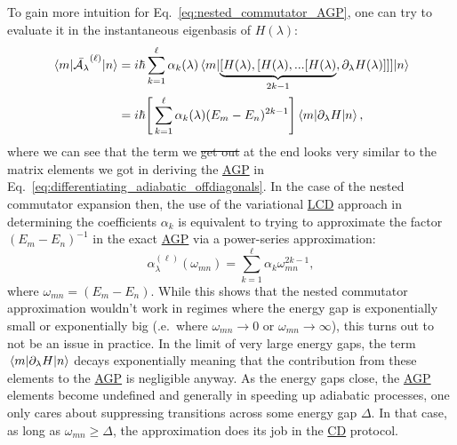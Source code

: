\documentclass[a4paper,oneside,11pt]{book}
\newcommand{\dlambda}{\partial_{\lambda}}
\newcommand{\AGP}[1]{\mathcal{A}_{#1}}
\newcommand{\acrref}[1]{\hyperref[acr:#1]{#1}}
\providecommand{\DIFaddtex}[1]{{\protect\color{blue}\uwave{#1}}} %
\providecommand{\DIFdeltex}[1]{{\protect\color{red}\sout{#1}}}                      %
\providecommand{\DIFaddbegin}{} %
\providecommand{\DIFaddend}{} %
\providecommand{\DIFdelbegin}{} %
\providecommand{\DIFdelend}{} %
\providecommand{\DIFadd}[1]{\texorpdfstring{\DIFaddtex{#1}}{#1}} %
\providecommand{\DIFdel}[1]{\texorpdfstring{\DIFdeltex{#1}}{}} %
\newcommand{\DIFscaledelfig}{0.5}
\newlength{\DIFdelgraphicswidth} %
\newlength{\DIFdelgraphicsheight} %
\newcommand{\DIFaddincludegraphics}[2][]{{\color{blue}\fbox{\DIFOincludegraphics[#1]{#2}}}} %
\newcommand{\DIFdelincludegraphics}[2][]{%
\sbox{\DIFdelgraphicsbox}{\DIFOincludegraphics[#1]{#2}}%
\settoboxwidth{\DIFdelgraphicswidth}{\DIFdelgraphicsbox} %
\settoboxtotalheight{\DIFdelgraphicsheight}{\DIFdelgraphicsbox} %
\scalebox{\DIFscaledelfig}{%
\parbox[b]{\DIFdelgraphicswidth}{\usebox{\DIFdelgraphicsbox}\\[-\baselineskip] \rule{\DIFdelgraphicswidth}{0em}}\llap{\resizebox{\DIFdelgraphicswidth}{\DIFdelgraphicsheight}{%
\setlength{\unitlength}{\DIFdelgraphicswidth}%
\begin{picture}(1,1)%
\thicklines\linethickness{2pt} %
{\color[rgb]{1,0,0}\put(0,0){\framebox(1,1){}}}%
{\color[rgb]{1,0,0}\put(0,0){\line( 1,1){1}}}%
{\color[rgb]{1,0,0}\put(0,1){\line(1,-1){1}}}%
\end{picture}%
}\hspace*{3pt}}} %
} %
\DeclareRobustCommand{\DIFaddbegin}{\DIFOaddbegin \let\includegraphics\DIFaddincludegraphics} %
\DeclareRobustCommand{\DIFaddend}{\DIFOaddend \let\includegraphics\DIFOincludegraphics} %
\DeclareRobustCommand{\DIFdelbegin}{\DIFOdelbegin \let\includegraphics\DIFdelincludegraphics} %
\DeclareRobustCommand{\DIFdelend}{\DIFOaddend \let\includegraphics\DIFOincludegraphics} %
\begin{document}
    To gain more intuition for Eq.~\eqref{eq:nested_commutator_AGP}, one can try to evaluate it in the instantaneous eigenbasis of $H(\lambda)$:
    \begin{equation}\label{eq:nested_commutator_matrix_elements}
        \begin{aligned}
            \mel*{m}{\Bar{\AGP{\lambda}}^{(\ell)}}{n} &= i\hbar \sum_{k=1}^\ell \alpha_k(\lambda) \mel*{m}{\underbrace{[H(\lambda),[H(\lambda),...[H(\lambda)}_{2k-1},\dlambda H(\lambda)]]]}{n} \\
            &= i\hbar \Bigg[ \sum_{k=1}^\ell \alpha_k(\lambda)(E_m - E_n)^{2k - 1} \Bigg] \mel{m}{\dlambda H}{n},
        \end{aligned}
    \end{equation}
    where we can see that the term we \DIFdelbegin \DIFdel{get out }\DIFdelend \DIFaddbegin \DIFadd{obtain }\DIFaddend at the end looks very similar to the matrix elements we got in deriving the \acrref{AGP} in Eq.~\eqref{eq:differentiating_adiabatic_offdiagonals}. In the case of the nested commutator expansion then, the use of the variational \acrref{LCD} approach in determining the coefficients $\alpha_k$ is equivalent to trying to approximate the factor $(E_m - E_n)^{- 1}$ in the exact \acrref{AGP} via a power-series approximation:
    \begin{equation}
        \alpha_{\lambda}^{(\ell)}(\omega_{mn}) = \sum_{k=1}^\ell \alpha_k \omega_{mn}^{2k - 1},
    \end{equation}
    where $\omega_{mn} = (E_m - E_n)$. While this shows that the nested commutator approximation wouldn't work in regimes where the energy gap is exponentially small or exponentially big (\@i.e.~where $\omega_{mn} \rightarrow 0$ or $\omega_{mn} \rightarrow \infty$), this turns out to not be an issue in practice. In the limit of very large energy gaps, the term $\mel{m}{\dlambda H}{n}$ decays exponentially meaning that the contribution from these elements to the \acrref{AGP} is negligible anyway. As the energy gaps close, the \acrref{AGP} elements become undefined and generally in speeding up adiabatic processes, one only cares about suppressing transitions across some energy gap $\Delta$. In that case, as long as $\omega_{mn} \geq \Delta$, the approximation does its job in the \acrref{CD} protocol.
\end{document}
